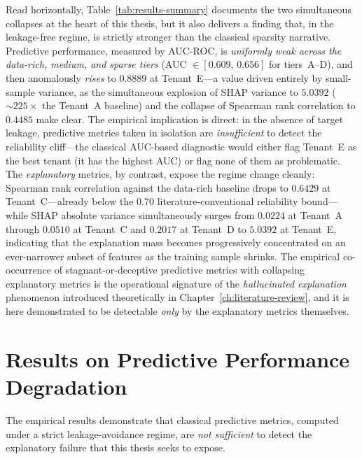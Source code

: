 Read horizontally, Table~\ref{tab:results-summary} documents the two
simultaneous collapses at the heart of this thesis, but it also delivers a
finding that, in the leakage-free regime, is strictly stronger than the
classical sparsity narrative. Predictive performance, measured by AUC-ROC,
is \emph{uniformly weak across the data-rich, medium, and sparse tiers}
(AUC $\in [0.609,\, 0.656]$ for tiers~A--D), and then anomalously
\emph{rises} to $0.8889$ at Tenant~E---a value driven entirely by
small-sample variance, as the simultaneous explosion of SHAP variance to
$5.0392$ ($\sim\!225\times$ the Tenant~A baseline) and the collapse of
Spearman rank correlation to $0.4485$ make clear. The empirical implication
is direct: in the absence of target leakage, predictive metrics taken in
isolation are \emph{insufficient} to detect the reliability cliff---the
classical AUC-based diagnostic would either flag Tenant~E as the best
tenant (it has the highest AUC) or flag none of them as problematic. The
\emph{explanatory} metrics, by contrast, expose the regime change cleanly:
Spearman rank correlation against the data-rich baseline drops to $0.6429$
at Tenant~C---already below the $0.70$ literature-conventional reliability
bound---while SHAP absolute variance simultaneously surges from $0.0224$ at
Tenant~A through $0.0510$ at Tenant~C and $0.2017$ at Tenant~D to $5.0392$
at Tenant~E, indicating that the explanation mass becomes progressively
concentrated on an ever-narrower subset of features as the training sample
shrinks. The empirical co-occurrence of stagnant-or-deceptive predictive
metrics with collapsing explanatory metrics is the operational signature of
the \emph{hallucinated explanation} phenomenon introduced theoretically in
Chapter~\ref{ch:literature-review}, and it is here demonstrated to be
detectable \emph{only} by the explanatory metrics themselves.

\section{Results on Predictive Performance Degradation}
\label{sec:results-predictive}

The empirical results demonstrate that classical predictive metrics,
computed under a strict leakage-avoidance regime, are \emph{not sufficient}
to detect the explanatory failure that this thesis seeks to expose.

